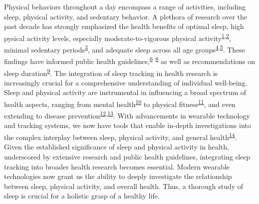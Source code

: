 \documentclass[
  10pt,
]{scrbook}
\begin{document}
Physical behaviors throughout a day encompass a range of activities,
including sleep, physical activity, and sedentary behavior. A plethora
of research over the past decade has strongly emphasized the health
benefits of optimal sleep, high pysical activity levels, especially
moderate-to-vigorous physical
activity\textsuperscript{\protect\hyperlink{ref-kraus_physical_2019}{1},\protect\hyperlink{ref-lee_effect_2012}{2}},
minimal sedentary
periods\textsuperscript{\protect\hyperlink{ref-wilmot_sedentary_2012}{3}},
and adequate sleep across all age
groups\textsuperscript{\protect\hyperlink{ref-cappuccio_sleep_2010}{4},\protect\hyperlink{ref-jennum_suxf8vn_sundhed_2015}{5}}.
These findings have informed public health
guidelines,\textsuperscript{\protect\hyperlink{ref-kl_physical_2018}{6}--\protect\hyperlink{ref-el-zine_fysisk_nodate}{8}}
as well as recommendations on sleep
duration\textsuperscript{\protect\hyperlink{ref-hirshkowitz_2015}{9}}.
The integration of sleep tracking in health research is increasingly
crucial for a comprehensive understanding of individual well-being.
Sleep and physical activity are instrumental in influencing a broad
spectrum of health aspects, ranging from mental
health\textsuperscript{\protect\hyperlink{ref-biddle_physical_2011}{10}}
to physical
fitness\textsuperscript{\protect\hyperlink{ref-warburton_health_2017}{11}},
and even extending to disease
prevention\textsuperscript{\protect\hyperlink{ref-strath_guide_2013}{12},\protect\hyperlink{ref-arem_leisure_2015}{13}}.
With advancements in wearable technology and tracking systems, we now
have tools that enable in-depth investigations into the complex
interplay between sleep, physical activity, and general
health\textsuperscript{\protect\hyperlink{ref-rollo_whole_2020}{14}}.
Given the established significance of sleep and physical activity in
health, underscored by extensive research and public health guidelines,
integrating sleep tracking into broader health research becomes
essential. Modern wearable technologies now grant us the ability to
deeply investigate the relationship between sleep, physical activity,
and overall health. Thus, a thorough study of sleep is crucial for a
holistic grasp of a healthy life.
\end{document}

